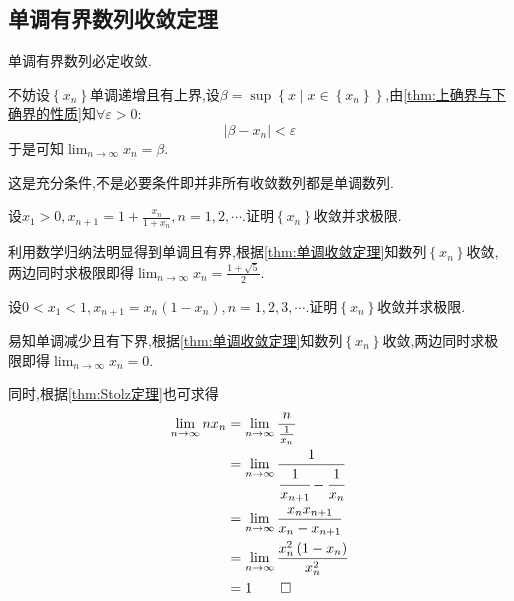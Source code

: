 \subsection{单调有界数列收敛定理}
\begin{formal}
    \begin{theorem}[单调收敛定理]\label{thm:单调收敛定理}
        单调有界数列必定收敛.
    \end{theorem}
    \begin{Proof}
        不妨设$\left\{x_n\right\}$单调递增且有上界,设$\beta=\sup\left\{x\mid x\in\left\{x_n\right\}\right\}$,由\cref{thm:上确界与下确界的性质}知$\forall \varepsilon>0:$\[
        \left|
            \beta-x_n
        \right|<\varepsilon
        \]于是可知$\displaystyle\lim_{n\to\infty}x_n=\beta$.
    \end{Proof}
\end{formal}
\begin{red}
    \begin{remark}
        这是充分条件,不是必要条件即并非所有收敛数列都是单调数列.
    \end{remark}
\end{red}
\begin{brown}
    \begin{example}
        设$\displaystyle x_1>0,x_{n+1}=1+\frac{x_n}{1+x_n},n=1,2,\cdots.$证明$\left\{x_n\right\}$收敛并求极限.
    \end{example}
    \begin{Proof}
        利用数学归纳法明显得到单调且有界,根据\cref{thm:单调收敛定理}知数列$\left\{x_n\right\}$收敛,两边同时求极限即得$\displaystyle \lim_{n\to\infty}x_n=\frac{1+\sqrt{5}}{2}.$
    \end{Proof}
\end{brown}
\begin{brown}
    \begin{example}
        设$0<x_1<1,x_{n+1}=x_n\left(1-x_n\right),n=1,2,3,\cdots.$证明$\left\{x_n\right\}$收敛并求极限.
    \end{example}
    \begin{Proof}
        易知单调减少且有下界,根据\cref{thm:单调收敛定理}知数列$\left\{x_n\right\}$收敛,两边同时求极限即得$\displaystyle \lim_{n\to\infty}x_n=0.$

        同时,根据\cref{thm:Stolz定理}也可求得\begin{align*}
        \lim_{n\to\infty}nx_n&=\lim_{n\to\infty}\frac{n}{\frac{1}{x_n}}\\
        &=\lim_{n\to\infty}\frac{1}{\cfrac{1}{x_{n+1}}-\cfrac{1}{x_n}}\\
        &=\lim_{n\to\infty}\frac{x_nx_{n+1}}{x_n-x_{n+1}}\\
        &=\lim_{n\to\infty}\frac{x_n^2\left(1-x_n\right)}{x_n^2}\\
        &=1\qedhere
        \end{align*}
    \end{Proof}
\end{brown}
